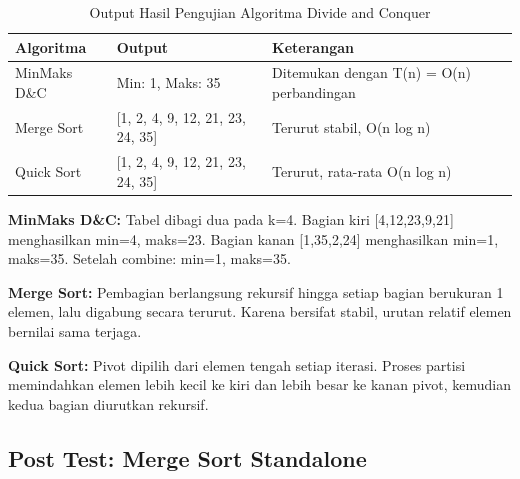 \begin{table}[H]
    \centering
    \caption{Output Hasil Pengujian Algoritma Divide and Conquer}
    \begin{tabular}{p{3cm}p{5cm}p{6cm}}
    \toprule
    \textbf{Algoritma} & \textbf{Output} & \textbf{Keterangan} \\ \midrule
    MinMaks D\&C & Min: 1, Maks: 35 & Ditemukan dengan T(n) = O(n) perbandingan \\
    Merge Sort & [1, 2, 4, 9, 12, 21, 23, 24, 35] & Terurut stabil, O(n log n) \\
    Quick Sort & [1, 2, 4, 9, 12, 21, 23, 24, 35] & Terurut, rata-rata O(n log n) \\ \bottomrule
    \end{tabular}
\end{table}

\textbf{MinMaks D\&C:} Tabel dibagi dua pada k=4. Bagian kiri [4,12,23,9,21] menghasilkan min=4, maks=23. Bagian kanan [1,35,2,24] menghasilkan min=1, maks=35. Setelah combine: min=1, maks=35.

\textbf{Merge Sort:} Pembagian berlangsung rekursif hingga setiap bagian berukuran 1 elemen, lalu digabung secara terurut. Karena bersifat stabil, urutan relatif elemen bernilai sama terjaga.

\textbf{Quick Sort:} Pivot dipilih dari elemen tengah setiap iterasi. Proses partisi memindahkan elemen lebih kecil ke kiri dan lebih besar ke kanan pivot, kemudian kedua bagian diurutkan rekursif.

\subsection{Post Test: Merge Sort Standalone}

